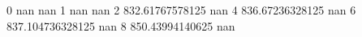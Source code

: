 0 nan nan
1 nan nan
2 832.61767578125 nan
4 836.67236328125 nan
6 837.104736328125 nan
8 850.43994140625 nan
